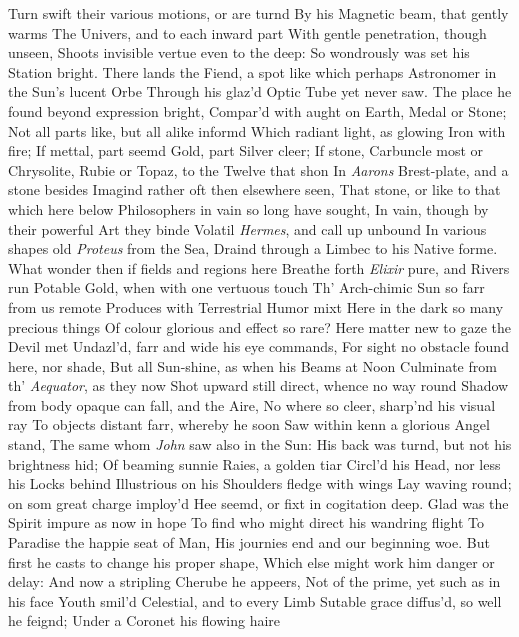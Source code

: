 \documentclass[11pt]{book}
\newcounter {first}
\begin{document}
Turn swift their various motions, or are turnd 
By his Magnetic beam, that gently warms 
The Univers, and to each inward part 
With gentle penetration, though unseen, 
Shoots invisible vertue even to the deep: 
So wondrously was set his Station bright. 
There lands the Fiend, a spot like which perhaps 
Astronomer in the Sun's lucent Orbe 
Through his glaz'd Optic Tube yet never saw. 
The place he found beyond expression bright, 
Compar'd with aught on Earth, Medal or Stone; 
Not all parts like, but all alike informd 
Which radiant light, as glowing Iron with fire; 
If mettal, part seemd Gold, part Silver cleer; 
If stone, Carbuncle most or Chrysolite, 
Rubie or Topaz, to the Twelve that shon 
In \textit{Aarons} Brest-plate, and a stone besides 
Imagind rather oft then elsewhere seen, 
That stone, or like to that which here below 
Philosophers in vain so long have sought, 
In vain, though by their powerful Art they binde 
Volatil \textit{Hermes}, and call up unbound 
In various shapes old \textit{Proteus} from the Sea, 
Draind through a Limbec to his Native forme. 
What wonder then if fields and regions here 
Breathe forth \textit{Elixir} pure, and Rivers run 
Potable Gold, when with one vertuous touch 
Th' Arch-chimic Sun so farr from us remote 
Produces with Terrestrial Humor mixt 
Here in the dark so many precious things 
Of colour glorious and effect so rare? 
Here matter new to gaze the Devil met 
Undazl'd, farr and wide his eye commands, 
For sight no obstacle found here, nor shade, 
But all Sun-shine, as when his Beams at Noon 
Culminate from th' \textit{Aequator}, as they now 
Shot upward still direct, whence no way round 
Shadow from body opaque can fall, and the Aire, 
No where so cleer, sharp'nd his visual ray 
To objects distant farr, whereby he soon 
Saw within kenn a glorious Angel stand, 
The same whom \textit{John} saw also in the Sun: 
His back was turnd, but not his brightness hid; 
Of beaming sunnie Raies, a golden tiar 
Circl'd his Head, nor less his Locks behind 
Illustrious on his Shoulders fledge with wings 
Lay waving round; on som great charge imploy'd 
Hee seemd, or fixt in cogitation deep. 
Glad was the Spirit impure as now in hope 
To find who might direct his wandring flight 
To Paradise the happie seat of Man, 
His journies end and our beginning woe. 
But first he casts to change his proper shape, 
Which else might work him danger or delay: 
And now a stripling Cherube he appeers, 
Not of the prime, yet such as in his face 
Youth smil'd Celestial, and to every Limb 
Sutable grace diffus'd, so well he feignd; 
Under a Coronet his flowing haire 
\end{document}
